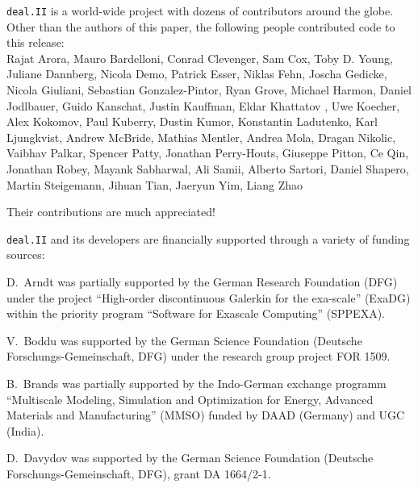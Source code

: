 \documentclass{ansarticle-preprint}
\newcommand{\specialword}[1]{\texttt{#1}}
\newcommand{\dealii}{{\specialword{deal.II}}}
\begin{document}
\dealii{} is a world-wide project with dozens of contributors around the
globe. Other than the authors of this paper, the following people contributed code to
this release:\\
%
%
  Rajat Arora,
  Mauro Bardelloni,
  Conrad Clevenger,
  Sam Cox,
  Toby D. Young,
  Juliane Dannberg,
  Nicola Demo,
  Patrick Esser,
  Niklas Fehn,
  Joscha Gedicke,
  Nicola Giuliani,
  Sebastian Gonzalez-Pintor,
  Ryan Grove,
  Michael Harmon,
  Daniel Jodlbauer,
  Guido Kanschat,
  Justin Kauffman,
  Eldar Khattatov ,
  Uwe Koecher,
  Alex Kokomov,
  Paul Kuberry,
  Dustin Kumor,
  Konstantin Ladutenko,
  Karl Ljungkvist,
  Andrew McBride,
  Mathias Mentler,
  Andrea Mola,
  Dragan Nikolic,
  Vaibhav Palkar,
  Spencer Patty,
  Jonathan Perry-Houts,
  Giuseppe Pitton,
  Ce Qin,
  Jonathan Robey,
  Mayank Sabharwal,
  Ali Samii,
  Alberto Sartori,
  Daniel Shapero,
  Martin Steigemann,
  Jihuan Tian,
  Jaeryun Yim,
  Liang Zhao


Their contributions are much appreciated!


\bigskip

\dealii{} and its developers are financially supported through a
variety of funding sources:

D.~Arndt was partially supported by the German Research Foundation (DFG) under the
project ``High-order discontinuous Galerkin for the exa-scale'' (ExaDG) within the
priority program ``Software for Exascale Computing'' (SPPEXA).

%
V.~Boddu was supported by the German Science Foundation (Deutsche 
Forschungs-Gemeinschaft, DFG) under the research group project FOR 1509.

B.~Brands was partially supported by the Indo-German exchange programm ``Multiscale Modeling, Simulation and Optimization for Energy, Advanced Materials and Manufacturing'' (MMSO) funded by DAAD (Germany) and UGC (India).

D.~Davydov was supported by the German Science Foundation
(Deutsche Forschungs-Gemeinschaft, DFG), grant DA 1664/2-1.
\end{document}
